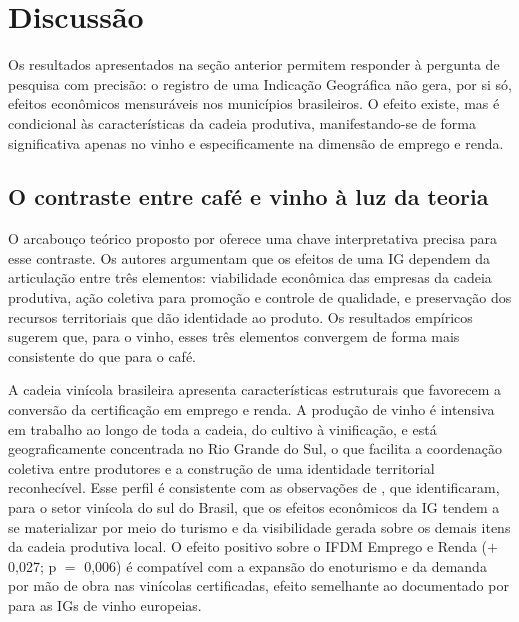 \documentclass[12pt, a4paper]{article}
\begin{document}
\section{Discussão}

Os resultados apresentados na seção anterior permitem responder à pergunta de pesquisa com precisão: o registro de uma Indicação Geográfica não gera, por si só, efeitos econômicos mensuráveis nos municípios brasileiros. O efeito existe, mas é condicional às características da cadeia produtiva, manifestando-se de forma significativa apenas no vinho e especificamente na dimensão de emprego e renda.

\subsection{O contraste entre café e vinho à luz da teoria}

O arcabouço teórico proposto por \citet{belletti2017} oferece uma chave interpretativa precisa para esse contraste. Os autores argumentam que os efeitos de uma IG dependem da articulação entre três elementos: viabilidade econômica das empresas da cadeia produtiva, ação coletiva para promoção e controle de qualidade, e preservação dos recursos territoriais que dão identidade ao produto. Os resultados empíricos sugerem que, para o vinho, esses três elementos convergem de forma mais consistente do que para o café.

A cadeia vinícola brasileira apresenta características estruturais que favorecem a conversão da certificação em emprego e renda. A produção de vinho é intensiva em trabalho ao longo de toda a cadeia, do cultivo à vinificação, e está geograficamente concentrada no Rio Grande do Sul, o que facilita a coordenação coletiva entre produtores e a construção de uma identidade territorial reconhecível. Esse perfil é consistente com as observações de \citet{maiorki2015}, que identificaram, para o setor vinícola do sul do Brasil, que os efeitos econômicos da IG tendem a se materializar por meio do turismo e da visibilidade gerada sobre os demais itens da cadeia produtiva local. O efeito positivo sobre o IFDM Emprego e Renda ($+$0,027; p $=$ 0,006) é compatível com a expansão do enoturismo e da demanda por mão de obra nas vinícolas certificadas, efeito semelhante ao documentado por \citet{desimone2024} para as IGs de vinho europeias.
\end{document}
